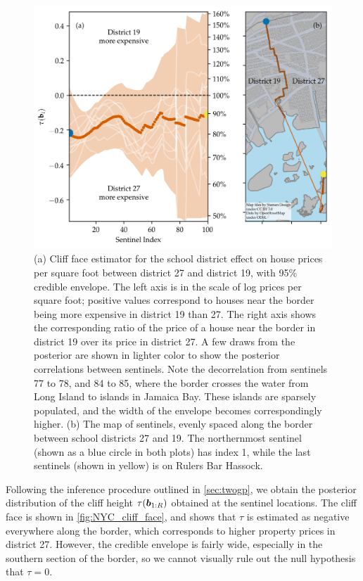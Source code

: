 \documentclass[12pt]{article}
\begin{document}
\begin{figure}[tb]
    \centering
    \includegraphics[height=0.4\textheight]{../NYC/NYC_plots/NYC_cliff_face.png}
    \caption{\label{fig:NYC_cliff_face}
        (a)
        Cliff face estimator for the school district effect on house prices per square foot between district 27 and district 19, with 95\% credible envelope.
        The left axis is in the scale of log prices per square foot; positive values correspond to houses near the border being more expensive in district 19 than 27.
        The right axis shows the corresponding ratio of the price of a house near the border in district 19 over its price in district 27.
        A few draws from the posterior are shown in lighter color to show the posterior correlations between sentinels.
        Note the decorrelation from sentinels 77 to 78, and 84 to 85, where the border crosses the water from Long Island to islands in Jamaica Bay.  These islands are sparsely populated, and the width of the envelope becomes correspondingly higher.
        (b)
        The map of sentinels, evenly spaced along the border between school districts 27 and 19.
    The northernmost sentinel (shown as a blue circle in both plots) has index 1, while the last sentinels (shown in yellow) is on Rulers Bar Hassock.}
\end{figure}

Following the inference procedure outlined in \autoref{sec:twogp}, we obtain the posterior distribution of the cliff height \(\tau(\bm{b}_{1:R})\) obtained at the sentinel locations.
The cliff face is shown in \autoref{fig:NYC_cliff_face}, and shows that \(\tau\) is estimated as negative everywhere along the border, which corresponds to higher property prices in district 27.
However, the credible envelope is fairly wide, especially in the southern section of the border, so we cannot visually rule out the null hypothesis that \(\tau=0\).
\end{document}
